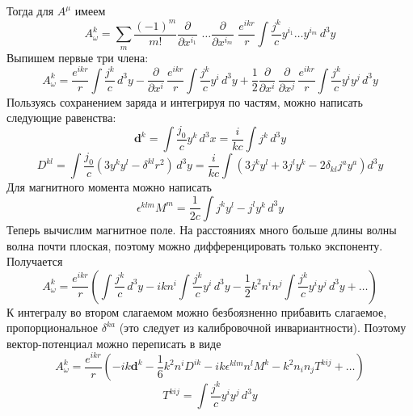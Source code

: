\documentclass{article}
\begin{document}
Тогда для $A^{\mu}$ имеем
\begin{equation}
	A_{\omega}^{k} = \sum_m \frac{(-1)^m}{m!}
			\frac{\partial}{\partial x^{i_1}\!\!\!\!\!}\,\, \dots 
				\frac{\partial}{\partial x^{i_m}\!\!\!\!\!}\,\,
				\frac{e^{ikr}}{r}
					\int \frac{j^k}{c} y^{i_1} \dots y^{i_m} \, d^3 y
\end{equation}
Выпишем первые три члена:
\begin{equation}
	A_{\omega}^{k} = \frac{e^{ikr}}{r} \int \frac{j^k}{c} \, d^3 y - 
					\frac{\partial}{\partial x^{i}\!\!\!}\,\frac{e^{ikr}}{r} 
								\int \frac{j^k}{c}y^i \, d^3 y + 
					\frac{1}{2}\frac{\partial}{\partial x^{i}\!\!\!}\,
					\frac{\partial}{\partial x^{j}\!\!\!}\,
						\frac{e^{ikr}}{r} 
								\int \frac{j^k}{c}y^iy^j \, d^3 y  
\end{equation}
Пользуясь сохранением заряда и интегрируя по частям, можно написать следующие равенства:
\begin{equation}
	{\mathbf d}^k = \int  \frac{j_0}{c} y^k\, d^3 x = \frac{i}{kc} \int j^{k}\, d^3 y
\end{equation}
\begin{equation}
	D^{kl} = \int  \frac{j_0}{c} (3y^ky^l - \delta^{kl}r^2)\, d^3 y =
			\frac{i}{kc} \int (3j^k y^l + 3j^l y^k - 2\delta_{kl}j^ay^a) d^3y
\end{equation}
Для магнитного момента можно написать
\begin{equation}
	\epsilon^{klm}M^{m} = \frac{1}{2c} \int j^k y^l - j^l y^k\, d^3 y
\end{equation}
Теперь вычислим магнитное поле.
На расстояниях много больше длины волны волна почти плоская, поэтому можно дифференцировать
только экспоненту.
Получается
\begin{equation}
	A_{\omega}^{k} = \frac{e^{ikr}}{r} \left(\int \frac{j^k}{c} \, d^3 y - 
					ik n^i\int \frac{j^k}{c}y^i \, d^3 y -
					\frac{1}{2}k^2 n^i n^j\int \frac{j^k}{c}y^iy^j \, d^3 y + \dots\right)
\end{equation}
К интегралу во втором слагаемом можно безбоязненно прибавить слагаемое, пропорциональное
$\delta^{ka}$ (это следует из калибровочной инвариантности). Поэтому вектор-потенциал
можно переписать в виде
\begin{equation}
	A_{\omega}^{k} = \frac{e^{ikr}}{r} \left(-ik\mathbf{d}^k - \frac16k^2n^iD^{ik} -
			ik\epsilon^{klm}n^lM^k - k^2 n_i n_j T^{kij} +  \dots\right)
\end{equation}
\begin{equation}
	T^{kij} = \int \frac{j^k}{c}y^iy^j \, d^3 y
\end{equation}
\end{document}
